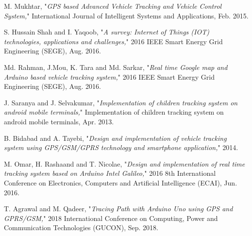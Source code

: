 \cleardoublepage
{}
{}
\begin{thebibliography}{99}
	
	M. Mukhtar, "\textit{{GPS} based Advanced Vehicle Tracking and Vehicle Control System,}" International Journal of Intelligent Systems and Applications, Feb. 2015.
	
	S. Hussain Shah and I. Yaqoob, "\textit{A survey: Internet of Things ({IOT}) technologies,  applications and challenges,}" 2016 {IEEE} Smart Energy Grid Engineering ({SEGE}), Aug. 2016.
	
	
	Md. Rahman, J.Mou, K. Tara and Md. Sarkar, "\textit{Real time Google map and Arduino based vehicle tracking system,}" 2016 {IEEE} Smart Energy Grid Engineering ({SEGE}), Aug. 2016.
	
	
	J. Saranya and J. Selvakumar, "\textit{Implementation of children tracking system on android mobile terminals,}" Implementation of children tracking system on android mobile terminals, Apr. 2013.
	
	B. Bidabad and A. Tayebi, "\textit{Design and implementation of vehicle tracking system using GPS/GSM/GPRS technology and smartphone application,}" 2014.
	
	M. Omar, H. Rashaand and T. Nicolae, "\textit{Design and implementation of real time tracking system based on Arduino Intel Galileo,}" 2016 8th International Conference on Electronics,  Computers and Artificial Intelligence ({ECAI}), Jun. 2016.

	T. Agrawal and M. Qadeer, "\textit{Tracing Path with Arduino Uno using {GPS} and {GPRS}/{GSM},}" 2018 International Conference on Computing,  Power and Communication Technologies ({GUCON}), Sep. 2018.
	
	
	
	
\end{thebibliography}